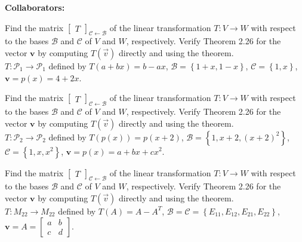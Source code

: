 \documentclass[11pt,letterpaper,boxed]{hmcpset}
\newcommand{\crb}[1]{\left\{ #1 \right\}}
\newcommand{\VEC}[1]{\ensuremath{\mathbf{#1}}\xspace}
\begin{document}
\noindent\textbf{Collaborators:} 


\begin{problem}[Poole 6.6 \#2]
Find the matrix $\begin{bmatrix}T\end{bmatrix}_{\mathcal{C}\leftarrow\mathcal{B}}$ of the linear transformation
$T: V \rightarrow W$ with respect to the bases $\mathcal{B}$ and $\mathcal{C}$ of $V$ and $W$, respectively. Verify
Theorem 2.26 for the vector $\VEC{v}$ by computing $T(\vec{v})$ directly and using the theorem.\\

$T:\mathcal{P}_1\rightarrow \mathcal{P}_1$ defined by $T(a+bx)=b-ax$, $\mathcal{B} = \crb{1+x,1-x}$, $\mathcal{C} = \crb{1,x}$, $\VEC{v} = p(x) = 4+2x$.
\end{problem}

\begin{solution}
\vfill
\end{solution}
\newpage

\begin{problem}[Poole 6.6 \#4]
Find the matrix $\begin{bmatrix}T\end{bmatrix}_{\mathcal{C}\leftarrow\mathcal{B}}$ of the linear transformation
$T: V \rightarrow W$ with respect to the bases $\mathcal{B}$ and $\mathcal{C}$ of $V$ and $W$, respectively. Verify
Theorem 2.26 for the vector $\VEC{v}$ by computing $T(\vec{v})$ directly and using the theorem.\\

$T:\mathcal{P}_2\rightarrow \mathcal{P}_2$ defined by $T(p(x))=p(x+2)$, $\mathcal{B} = \crb{1,x+2,(x+2)^2}$, $\mathcal{C} = \crb{1,x,x^2}$, $\VEC{v} = p(x) = a+bx+cx^2$.
\end{problem}

\begin{solution}
\vfill
\end{solution}
\newpage

\begin{problem}[Poole 6.6 \#12]
Find the matrix $\begin{bmatrix}T\end{bmatrix}_{\mathcal{C}\leftarrow\mathcal{B}}$ of the linear transformation
$T: V \rightarrow W$ with respect to the bases $\mathcal{B}$ and $\mathcal{C}$ of $V$ and $W$, respectively. Verify
Theorem 2.26 for the vector $\VEC{v}$ by computing $T(\vec{v})$ directly and using the theorem.\\

$T: M_{22} \rightarrow M_{22}$ defined by $T(A) = A - A^T$, $\mathcal{B} = \mathcal{C} = \crb{E_{11},E_{12},E_{21},E_{22}}$, $\VEC{v} = A = \begin{bmatrix}a&b\\c&d\end{bmatrix}$.
\end{problem}
\end{document}
